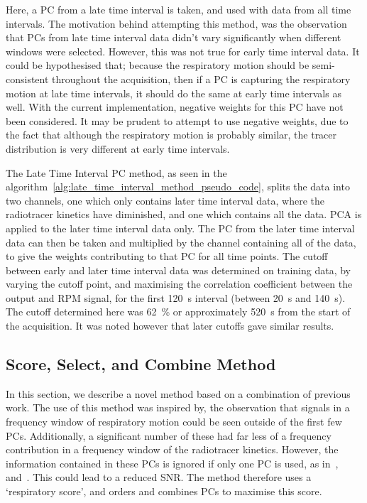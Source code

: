         Here, a \gls{PC} from a late time interval is taken, and used with data from all time intervals. The motivation behind attempting this method, was the observation that \glspl{PC} from late time interval data didn't vary significantly when different windows were selected. However, this was not true for early time interval data. It could be hypothesised that; because the respiratory motion should be semi-consistent throughout the acquisition, then if a \gls{PC} is capturing the respiratory motion at late time intervals, it should do the same at early time intervals as well. With the current implementation, negative weights for this \gls{PC} have not been considered. It may be prudent to attempt to use negative weights, due to the fact that although the respiratory motion is probably similar, the tracer distribution is very different at early time intervals.
            
        The Late Time Interval \gls{PC} method, as seen in the algorithm~\ref{alg:late_time_interval_method_pseudo_code}, splits the data into two channels, one which only contains later time interval data, where the radiotracer kinetics have diminished, and one which contains all the data. \gls{PCA} is applied to the later time interval data only. The \gls{PC} from the later time interval data can then be taken and multiplied by the channel containing all of the data, to give the weights contributing to that \gls{PC} for all time points. The cutoff between early and later time interval data was determined on training data, by varying the cutoff point, and maximising the correlation coefficient between the output and \gls{RPM} signal, for the first \SI{120}{\second} interval (between \SI{20}{\second} and \SI{140}{\second}). The cutoff determined here was \SI{62}{\percent} or approximately \SI{520}{\second} from the start of the acquisition. It was noted however that later cutoffs gave similar results.
            
    \subsection{Score, Select, and Combine Method} \label{sec:score_select_and_combine_method}
        In this section, we describe a novel method based on a combination of previous work. The use of this method was inspired by, the observation that signals in a frequency window of respiratory motion could be seen outside of the first few \glspl{PC}. Additionally, a significant number of these had far less of a frequency contribution in a frequency window of the radiotracer kinetics. However, the information contained in these \glspl{PC} is ignored if only one \gls{PC} is used, as in~\parencite{Thielemans2011}, and~\parencite{Bertolli2018Data-DrivenTomography}. This could lead to a reduced \gls{SNR}. The method therefore uses a `respiratory score', and orders and combines \glspl{PC} to maximise this score.
            
